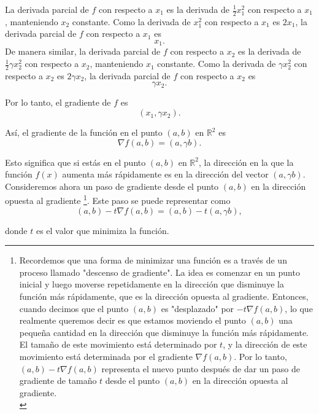\begin{enumerate}
\begin{enumerate}[(a)]
	    La derivada parcial de $f$ con respecto a $x_1$ es la derivada de $\frac{1}{2}x_1^2$ con respecto a $x_1$, manteniendo $x_2$ constante. Como la derivada de $x_1^2$ con respecto a $x_1$ es $2x_1$, la derivada parcial de $f$ con respecto a $x_1$ es 
	    $$x_1.$$ 
	    De manera similar, la derivada parcial de $f$ con respecto a $x_2$ es la derivada de $\frac{1}{2}\gamma x_2^2$ con respecto a $x_2$, manteniendo $x_1$ constante. Como la derivada de $\gamma x_2^2$ con respecto a $x_2$ es $2\gamma x_2$, la derivada parcial de $f$ con respecto a $x_2$ es 
	    $$\gamma x_2.$$

	    Por lo tanto, el gradiente de $f$ es 
	    $$(x_1, \gamma x_2).$$

	    Así, el gradiente de la función en el punto $(a,b)$ en $\mathbb{R}^2$ es 
	    $$\nabla f(a,b) = (a, \gamma b).$$

	    Esto significa que si estás en el punto $(a,b)$ en $\mathbb{R}^2$, la dirección en la que la función $f(x)$ aumenta más rápidamente es en la dirección del vector $(a, \gamma b)$.\\

	    Consideremos ahora un paso de gradiente desde el punto $(a,b)$ en la dirección opuesta al gradiente 
	    \footnote{
		Recordemos que una forma de minimizar una función es a través de un proceso llamado "descenso de gradiente". La idea es comenzar en un punto inicial y luego moverse repetidamente en la dirección que disminuye la función más rápidamente, que es la dirección opuesta al gradiente. Entonces, cuando decimos que el punto $(a,b)$ es "desplazado" por $-t\nabla f(a,b)$, lo que realmente queremos decir es que estamos moviendo el punto $(a,b)$ una pequeña cantidad en la dirección que disminuye la función más rápidamente. El tamaño de este movimiento está determinado por $t$, y la dirección de este movimiento está determinada por el gradiente $\nabla f(a,b)$.
		Por lo tanto, $(a,b)-t\nabla f(a,b)$ representa el nuevo punto después de dar un paso de gradiente de tamaño $t$ desde el punto $(a,b)$ en la dirección opuesta al gradiente.\\}. 
	    Este paso se puede representar como 
	    $$(a,b)-t\nabla f(a,b)=(a,b)-t(a,\gamma b),$$ 

	    donde $t$ es el valor que minimiza la función.\\


\end{enumerate}
\end{enumerate}
